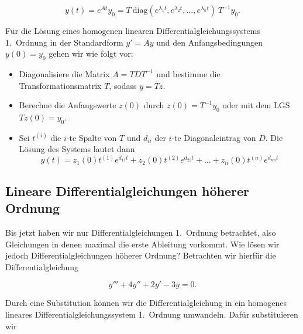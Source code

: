 \begin{equation*}
    y(t) = e^{At} y_0 = T \ \text{diag}(e^{\lambda_1 t}, e^{\lambda_2 t}, \ldots, e^{\lambda_n t}) \ T^{-1} y_0.
\end{equation*}

\begin{tcolorbox}[colback=gray!30, colframe=gray!80, title=Lösen von homogenen linearen Differentialgleichungssystemen]
    Für die Lösung eines homogenen linearen Differentialgleichungssystems 1.\ Ordnung in der Standardform \( y' = A y \) und den Anfangsbedingungen \( y(0) = y_0 \) gehen wir wie folgt vor:
    \begin{itemize}
        \item Diagonalisiere die Matrix \( A = TDT^{-1} \) und bestimme die Transformationsmatrix \( T \), sodass  \( y =Tz \).  
        \item Berechne die Anfangswerte \(z(0)\) durch \( z(0) = T^{-1} y_0 \) oder mit dem LGS \( T z(0) = y_0  \). 
        \item Sei \( t^{(i)} \) die \( i \)-te Spalte von \( T \) und \( d_{ii} \) der \( i \)-te Diagonaleintrag von \( D \). Die Lösung des Systems lautet dann
        \begin{equation*}
            y(t) = z_1(0) t^{(1)} e^{d_{11} t} + z_2(0) t^{(2)} e^{d_{22} t} + \ldots + z_n(0) t^{(n)} e^{d_{nn} t}
        \end{equation*}
    \end{itemize}
    
\end{tcolorbox}

\subsection{Lineare Differentialgleichungen höherer Ordnung}

Bis jetzt haben wir nur Differentialgleichungen 1.\ Ordnung betrachtet, also Gleichungen in denen maximal die erste Ableitung vorkommt. Wie lösen wir jedoch Differentialgleichungen höherer Ordnung? Betrachten wir hierfür die Differentialgleichung

\begin{equation*}
    y''' + 4 y'' + 2y' - 3 y = 0.
\end{equation*}

Durch eine Substitution können wir die Differentialgleichung in ein homogenes lineares Differentialgleichungssystem 1.\ Ordnung umwandeln. Dafür substituieren wir

